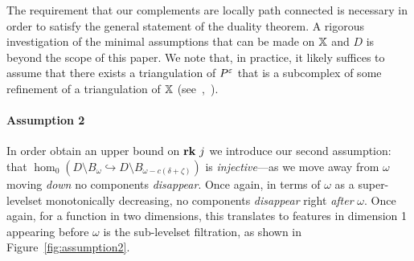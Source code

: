 The requirement that our complements are locally path connected is necessary in order to satisfy the general statement of the duality theorem.
A rigorous investigation of the minimal assumptions that can be made on $\mathbb{X}$ and $D$ is beyond the scope of this paper.
We note that, in practice, it likely suffices to assume that there exists a triangulation of $P^\varepsilon$ that is a subcomplex of some refinement of a triangulation of $\mathbb{X}$ (see~\cite{cavanna2017when},~\cite{julian83alexander}).

\paragraph{Assumption 2}

In order obtain an upper bound on $\mathbf{rk}~j$ we introduce our second assumption: that $\hom_0(D\setminus B_\omega\hookrightarrow D\setminus B_{\omega-c(\delta+\zeta)})$ is \emph{injective}---as we move away from $\omega$ moving \emph{down} no components \emph{disappear}.
Once again, in terms of $\omega$ as a super-levelset monotonically decreasing, no components \emph{disappear} right \emph{after} $\omega$.
Once again, for a function in two dimensions, this translates to features in dimension 1 appearing before $\omega$ is the sub-levelset filtration, as shown in Figure~\ref{fig:assumption2}.


